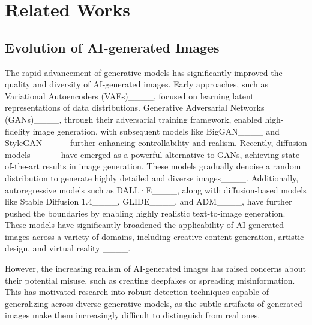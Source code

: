 \section{Related Works}

\subsection{Evolution of AI-generated Images}
The rapid advancement of generative models has significantly improved the quality and diversity of AI-generated images.
Early approaches, such as Variational Autoencoders (VAEs)____, focused on learning latent representations of data distributions. 
Generative Adversarial Networks (GANs)____, through their adversarial training framework, enabled high-fidelity image generation, with subsequent models like BigGAN____ and StyleGAN____ further enhancing controllability and realism.
Recently, diffusion models ____ have emerged as a powerful alternative to GANs, achieving state-of-the-art results in image generation. These models gradually denoise a random distribution to generate highly detailed and diverse images____.
Additionally, autoregressive models such as DALL·E____, along with diffusion-based models like Stable Diffusion 1.4____, GLIDE____, and ADM____, have further pushed the boundaries by enabling highly realistic text-to-image generation. These models have significantly broadened the applicability of AI-generated images across a variety of domains, including creative content generation, artistic design, and virtual reality ____.

However, the increasing realism of AI-generated images has raised concerns about their potential misuse, such as creating deepfakes or spreading misinformation. This has motivated research into robust detection techniques capable of generalizing across diverse generative models, as the subtle artifacts of generated images make them increasingly difficult to distinguish from real ones.

